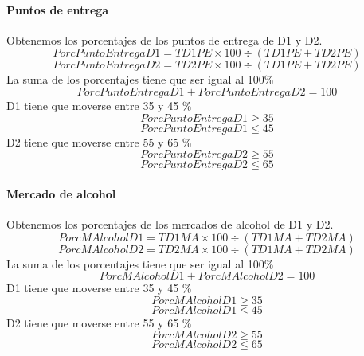 \paragraph{Puntos de entrega} Obtenemos los porcentajes de los puntos de entrega de D1 y D2.  
\begin{equation}
PorcPuntoEntregaD1 = TD1PE \times 100 \div (TD1PE + TD2PE)
\end{equation}
\begin{equation}
PorcPuntoEntregaD2 = TD2PE \times 100 \div (TD1PE + TD2PE)
\end{equation}
La suma de los porcentajes tiene que ser igual al 100\%
\begin{equation}
PorcPuntoEntregaD1 + PorcPuntoEntregaD2 = 100
\end{equation}
D1 tiene que moverse entre 35 y 45 \%
\begin{equation}
PorcPuntoEntregaD1 \geq 35
\end{equation}
\begin{equation}
PorcPuntoEntregaD1 \leq 45
\end{equation}
D2 tiene que moverse entre 55 y 65 \%
\begin{equation}
PorcPuntoEntregaD2 \geq 55
\end{equation}
\begin{equation}
PorcPuntoEntregaD2 \leq 65
\end{equation}
\paragraph{Mercado de alcohol} Obtenemos los porcentajes de los mercados de alcohol de D1 y D2.  
\begin{equation}
PorcMAlcoholD1 = TD1MA \times 100 \div (TD1MA + TD2MA)
\end{equation}
\begin{equation}
PorcMAlcoholD2 = TD2MA \times 100 \div (TD1MA + TD2MA)
\end{equation}
La suma de los porcentajes tiene que ser igual al 100\%
\begin{equation}
PorcMAlcoholD1 + PorcMAlcoholD2 = 100
\end{equation}
D1 tiene que moverse entre 35 y 45 \%
\begin{equation}
PorcMAlcoholD1 \geq 35
\end{equation}
\begin{equation}
PorcMAlcoholD1 \leq 45
\end{equation}
D2 tiene que moverse entre 55 y 65 \%
\begin{equation}
PorcMAlcoholD2 \geq 55
\end{equation}
\begin{equation}
PorcMAlcoholD2 \leq 65
\end{equation}
